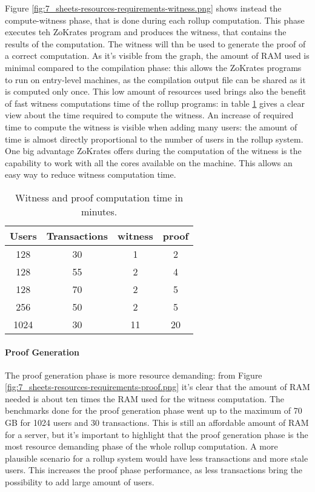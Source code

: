 Figure \ref{fig:7_sheets-resources-requirements-witness.png} shows instead the compute-witness phase, that is done during each rollup computation. This phase executes teh ZoKrates program and produces the witness, that contains the results of the computation. The witness will thn be used to generate the proof of a correct computation. As it's visible from the graph, the amount of RAM used is minimal compared to the compilation phase: this allows the ZoKrates programs to run on entry-level machines, as the compilation output file can be shared as it is computed only once. This low amount of resources used brings also the benefit of fast witness computations time of the rollup programs: in table \ref{tab:6_witness-proof-time} gives a clear view about the time required to compute the witness. An increase of required time to compute the witness is visible when adding many users: the amount of time is almost directly proportional to the number of users in the rollup system. One big advantage ZoKrates offers during the computation of the witness is the capability to work with all the cores available on the machine. This allows an easy way to reduce witness computation time.

\begin{table}
	\centering
	\begin{tabular}{|c|c|c|c|}
		\hline
		Users & Transactions & witness & proof \\ \hline
		128   & 30           & 1       & 2     \\ \hline
		128   & 55           & 2       & 4     \\ \hline
		128   & 70           & 2       & 5     \\ \hline
		256   & 50           & 2       & 5     \\ \hline
		1024  & 30           & 11      & 20    \\ \hline
	\end{tabular}
	\caption[Witness Proof time]{Witness and proof computation time in minutes.}
	\label{tab:6_witness-proof-time}
\end{table}

\paragraph{Proof Generation}

The proof generation phase is more resource demanding: from Figure \ref{fig:7_sheets-resources-requirements-proof.png} it's clear that the amount of RAM needed is about ten times the RAM used for the witness computation. The benchmarks done for the proof generation phase went up to the maximum of 70 GB for 1024 users and 30 transactions. This is still an affordable amount of RAM for a server, but it's important to highlight that the proof generation phase is the most resource demanding phase of the whole rollup computation. A more plausible scenario for a rollup system would have less transactions and more stale users. This increases the proof phase performance, as less transactions bring the possibility to add large amount of users.

